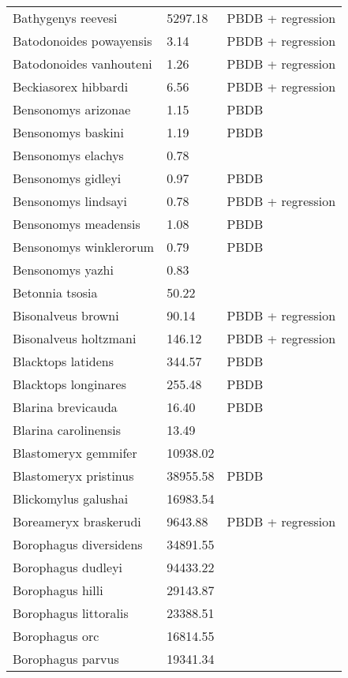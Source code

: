 \documentclass{article}
\begin{document}
\begin{center}
\begin{longtable}{p{} p{} p{}}
    Bathygenys reevesi & 5297.18 & PBDB + regression \\ 
    Batodonoides powayensis & 3.14 & PBDB + regression \\ 
    Batodonoides vanhouteni & 1.26 & PBDB + regression \\ 
    Beckiasorex hibbardi & 6.56 & PBDB + regression \\ 
    Bensonomys arizonae & 1.15 & PBDB \\ 
    Bensonomys baskini & 1.19 & PBDB \\ 
    Bensonomys elachys & 0.78 & \cite{Kirk2011} \\ 
    Bensonomys gidleyi & 0.97 & PBDB \\ 
    Bensonomys lindsayi & 0.78 & PBDB + regression \\ 
    Bensonomys meadensis & 1.08 & PBDB \\ 
    Bensonomys winklerorum & 0.79 & PBDB \\ 
    Bensonomys yazhi & 0.83 & \cite{Rose2013a} \\ 
    Betonnia tsosia & 50.22 & \cite{Clemens2005} \\ 
    Bisonalveus browni & 90.14 & PBDB + regression \\ 
    Bisonalveus holtzmani & 146.12 & PBDB + regression \\ 
    Blacktops latidens & 344.57 & PBDB \\ 
    Blacktops longinares & 255.48 & PBDB \\ 
    Blarina brevicauda & 16.40 & PBDB \\ 
    Blarina carolinensis & 13.49 & \cite{Smith2004} \\ 
    Blastomeryx gemmifer & 10938.02 & \cite{Tomiya2013} \\ 
    Blastomeryx pristinus & 38955.58 & PBDB \\ 
    Blickomylus galushai & 16983.54 & \cite{Tomiya2013} \\ 
    Boreameryx braskerudi & 9643.88 & PBDB + regression \\ 
    Borophagus diversidens & 34891.55 & \cite{Tomiya2013} \\ 
    Borophagus dudleyi & 94433.22 & \cite{Dalquest1978} \\ 
    Borophagus hilli & 29143.87 & \cite{Tomiya2013} \\ 
    Borophagus littoralis & 23388.51 & \cite{Tomiya2013} \\ 
    Borophagus orc & 16814.55 & \cite{Tomiya2013} \\ 
    Borophagus parvus & 19341.34 & \cite{Tomiya2013} \\ 

\end{longtable}
\end{center}
\end{document}
